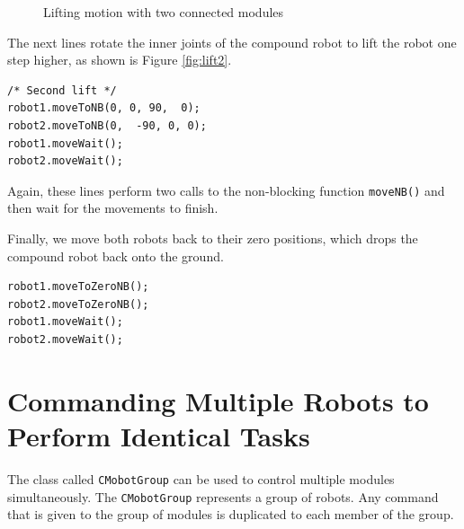 \documentclass{article}
\begin{document}
\begin{figure}
  \centering
  \caption{Lifting motion with two connected modules}
  \label{fig:lift}
\end{figure}

The next lines rotate the inner joints of the compound robot to lift the robot
one step higher, as shown is Figure \ref{fig:lift2}.
\begin{verbatim}
/* Second lift */
robot1.moveToNB(0, 0, 90,  0);
robot2.moveToNB(0,  -90, 0, 0);
robot1.moveWait();
robot2.moveWait();
\end{verbatim}
Again, these lines perform two calls to the non-blocking function
\texttt{moveNB()} and then wait for the movements to finish.

Finally, we move both robots back to their zero positions, which drops 
the compound robot back onto the ground.
\begin{verbatim}
robot1.moveToZeroNB();
robot2.moveToZeroNB();
robot1.moveWait();
robot2.moveWait();
\end{verbatim}

\section{Commanding Multiple Robots to Perform Identical Tasks}
The class called \texttt{CMobotGroup} can be used
to control multiple modules simultaneously. The \texttt{CMobotGroup} represents
a group of robots. Any command that is given to the group of modules is 
duplicated to each member of the group.
\end{document}
